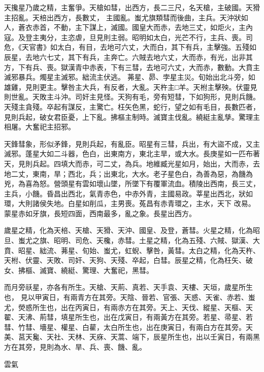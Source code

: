 \begin{pinyinscope}
 天攙星乃歲之精，主奮爭。天槍如彗，出西方，長二三尺，名天槍，主破國。天猾主招亂。天棓出西方，長數丈，
 主國亂。蚩尤旗類彗而後曲，主兵。天沖狀如人，蒼衣赤首，不動，主下謀上，滅國。國皇大而赤，去地三丈，如炬火，主內寇。及登主夷分，主恣虐，旦見則主弱。昭明如太白，光芒不行，主兵、喪。司危，《天官書》如太白，有目，去地可六丈，大而白，其下有兵，主擊強。五殘如辰星，去地六七丈，其下有兵，主奔亡。六賊去地六丈，大而赤，有光，出非其方，下有兵、喪。獄漢青中赤表，下有三彗，去地可六丈，大而赤，數動。大賁主滅邪暴兵。燭星主滅邪。絀流主伏逃。
 茀星、昴、孛星主災。旬始出北斗旁，如雄雞，見則更主。擊咎主大兵，有反者，大亂。天杵主□羊。天柎主擊殃。伏靈見則世亂。天敗主斗沖。司奸主見怪。天狗有毛，旁有短彗，下如狗形，見則兵饑。天殘主貪殘。卒起有謀反，主驚亡。枉矢色黑，蛇行，望之如有毛目，長數匹者，見則兵起，破女君臣憂，上下亂。拂樞主制時。滅寶主伐亂。繞綎主亂孳。驚理主相屠。大奮祀主招邪。



 天鋒彗象，形似矛鋒，見則兵起，有亂臣。昭星有三彗，兵出，有大盜不成，又主
 滅邪。蓬星大如二斗器，色白，出東南方，東北主旱，或大水。長庚星如一匹布著天，見則兵起。四填大而赤，可二丈，為兵。地維臧光星如月，始出，大而赤，去地二丈，東南，旱；西北，兵；出東北，大水。老子星色白，為善為惡，為饑為兇，為喜為怒。營頭星有雲如壞山墜，所墜下有覆軍流血。積陵出西南，長三丈，主兵，小饑。昏昌出西北，氣青赤色，中赤外青，主國易政。莘星出西北，狀如環，大則諸侯失地。白星如削瓜，主男喪。菟昌有赤青環之，主水，天下
 改易。蒙星赤如牙旗，長短四面，西南最多，亂之象。長星出西方。



 歲星之精，化為天棓、天槍、天猾、天沖、國皇、及登，蒼彗。火星之精，化為昭旦、蚩尤之旗、昭明、司危、天欃，赤彗。土星之精，化為五殘、六賊、獄漢、大賁、昭星、絀流、茀星、旬始、蚩尤，虹蜺、擊咎，黃彗。太白之精，化為天杵、天柎、伏靈、天敗、司奸、天狗、天殘、卒起，白彗。辰星之精，化為枉矢、破女、拂樞、滅寶、繞綎、驚理、大奮祀，黑彗。



 而月旁祅星，亦各有所生。天槍、天荊、真若、天手袁、天樓、天垣，歲星所生也，
 見以甲寅日，有兩青方在其旁。天陰、晉若、官張、天惑、天雀、赤若、蚩尤，熒惑所生也，出在丙寅日，有兩赤方在其旁。天上、天伐、縱星、天樞、天翟、天沸、荊彗，填星所生也，出在戊寅日，有兩黃方在其旁。若星、帚星、若彗、竹彗、墻星、權星、白雚，太白所生也，出在庚寅日，有兩白方在其旁。天美、莒天毚、天社、天林、天庥、天蒿、端下，辰星所生也，出以壬寅日，有兩黑方在其旁，見則為水、旱、兵、喪、饑、亂。



 雲氣




\end{pinyinscope}
